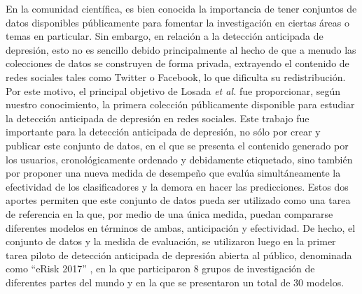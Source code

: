 En la comunidad científica, es bien conocida la importancia de tener conjuntos de datos disponibles públicamente para fomentar la investigación en ciertas áreas o temas en particular. %
Sin embargo, en relación a la detección anticipada de depresión, esto no es sencillo debido principalmente al hecho de que a menudo las colecciones de datos se construyen de forma privada, extrayendo el contenido de redes sociales tales como Twitter o Facebook, lo que dificulta su redistribución.
Por este motivo, el principal objetivo de Losada \emph{et al.} \cite{losada2016test} fue proporcionar, según nuestro conocimiento, la primera colección públicamente disponible para estudiar la detección anticipada de depresión en redes sociales.
Este trabajo fue importante para la detección anticipada de depresión, no sólo por crear y publicar este conjunto de datos, en el que se presenta el contenido generado por los usuarios, cronológicamente ordenado y debidamente etiquetado, sino también por proponer una nueva medida de desempeño que evalúa simultáneamente la efectividad de los clasificadores y la demora en hacer las predicciones.
Estos dos aportes permiten que este conjunto de datos pueda ser utilizado como una tarea de referencia en la que, por medio de una única medida, puedan compararse diferentes modelos en términos de ambas, anticipación y efectividad.
De hecho, el conjunto de datos y la medida de evaluación, se utilizaron luego en la primer tarea piloto de detección anticipada de depresión abierta al público, denominada como ``eRisk 2017'' \cite{losada2017erisk}, en la que participaron 8 grupos de investigación de diferentes partes del mundo y en la que se presentaron un total de 30 modelos.


